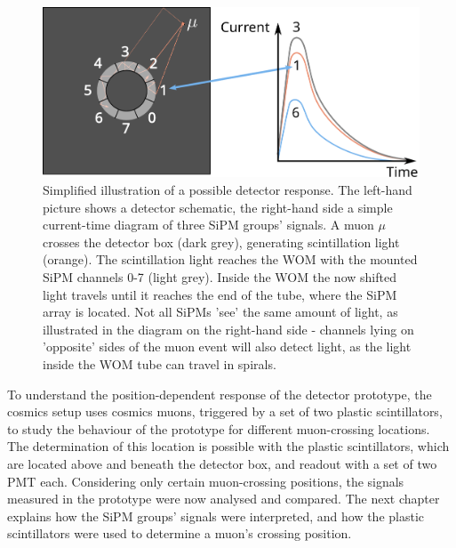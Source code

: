	\begin{figure}
		\centering
		\includegraphics[width=.8\textwidth]{pictures/detector-response.pdf}
		\caption{Simplified illustration of a possible detector response. The left-hand picture shows a detector schematic, the right-hand side a simple current-time diagram of three \ac{SiPM} groups' signals. A muon $\mu$ crosses the detector box (dark grey), generating scintillation light (orange). The scintillation light reaches the \ac{WOM} with the mounted \ac{SiPM} channels 0-7 (light grey). Inside the \ac{WOM} the now shifted light travels until it reaches the end of the tube, where the \ac{SiPM} array is located. Not all \acsp{SiPM} 'see' the same amount of light, as illustrated in the diagram on the right-hand side - channels lying on 'opposite' sides of the muon event will also detect light, as the light inside the \ac{WOM} tube can travel in spirals.}
		\label{fig:travel-path}
	\end{figure}
	
	
	
	To understand the position-dependent response of the detector prototype, the cosmics setup uses cosmics muons, triggered by a set of two plastic scintillators, to study the behaviour of the prototype for different muon-crossing locations. The determination of this location is possible with the plastic scintillators, which are located above and beneath the detector box, and readout with a set of two \ac{PMT} each. Considering only certain muon-crossing positions, the signals measured in the prototype were now analysed and compared.
	The next chapter explains how the \ac{SiPM} groups' signals were interpreted, and how the plastic scintillators were used to determine a muon's crossing position.
	





